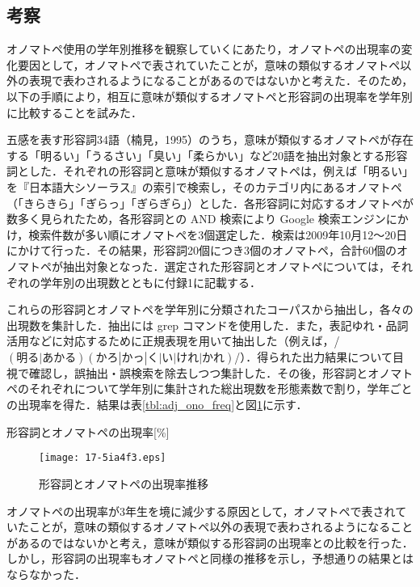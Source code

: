 \documentclass[japanese]{jnlp_1.4}
\begin{document}
\subsection{考察}

オノマトペ使用の学年別推移を観察していくにあたり，オノマトペの出現率の変化要因として，オノマトペで表されていたことが，意味の類似するオノマトペ以外の表現で表わされるようになることがあるのではないかと考えた．そのため，以下の手順により，相互に意味が類似するオノマトペと形容詞の出現率を学年別に比較することを試みた．

五感を表す形容詞34語（楠見，1995）のうち，意味が類似するオノマトペが存在する「明るい」「うるさい」「臭い」「柔らかい」など20語を抽出対象とする形容詞とした．それぞれの形容詞と意味が類似するオノマトペは，例えば「明るい」を『日本語大シソーラス』の索引で検索し，そのカテゴリ内にあるオノマトペ（「きらきら」「ぎらっ」「ぎらぎら」）とした．各形容詞に対応するオノマトペが数多く見られたため，各形容詞との AND 検索により Google 検索エンジンにかけ，検索件数が多い順にオノマトペを3個選定した．検索は2009年10月12〜20日にかけて行った．その結果，形容詞20個につき3個のオノマトペ，合計60個のオノマトペが抽出対象となった．選定された形容詞とオノマトペについては，それぞれの学年別の出現数とともに付録1に記載する．

これらの形容詞とオノマトペを学年別に分類されたコーパスから抽出し，各々の出現数を集計した．抽出には grep コマンドを使用した．また，表記ゆれ・品詞活用などに対応するために正規表現を用いて抽出した（例えば，/$(明る|あかる)(かろ|かっ|く|い|けれ|かれ)$/）．得られた出力結果について目視で確認し，誤抽出・誤検索を除去しつつ集計した．その後，形容詞とオノマトペのそれぞれについて学年別に集計された総出現数を形態素数で割り，学年ごとの出現率を得た．結果は表\ref{tbl:adj_ono_freq}と図\ref{fig:adj_ono_change}に示す．

\begin{table}[b]
\caption{形容詞とオノマトペの出現率[\%]}
\label{tbl:adj_ono_freq}

\end{table}
\begin{figure}[b]
\begin{center}
\texttt{[image: 17-5ia4f3.eps]}
\caption{形容詞とオノマトペの出現率推移}
\label{fig:adj_ono_change}
\end{center}
\end{figure}

オノマトペの出現率が3年生を境に減少する原因として，オノマトペで表されていたことが，意味の類似するオノマトペ以外の表現で表わされるようになることがあるのではないかと考え，意味が類似する形容詞の出現率との比較を行った．しかし，形容詞の出現率もオノマトペと同様の推移を示し，予想通りの結果とはならなかった．
\end{document}

